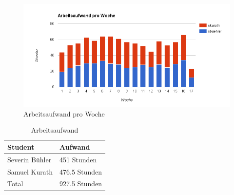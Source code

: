 \begin{figure}[H]
	\centering
	\includegraphics[width=480pt]{images/arbeitsaufwand.png}
	\caption{Arbeitsaufwand pro Woche}
\end{figure}

\begin{table}[H]
	\centering
    \begin{tabular}{|p{6cm}|p{6cm}|}
    \hline    
    \rowcolor{lightblue}
	Student & Aufwand \\ \hline   
	Severin Bühler & 451 Stunden \\ \hline
	Samuel Kurath & 476.5 Stunden \\ \hline
	\rowcolor{lightblue}
	Total & 927.5 Stunden \\ \hline
    \end{tabular}
    \caption[Arbeitsaufwand]{Arbeitsaufwand}
\end{table}

\newpage